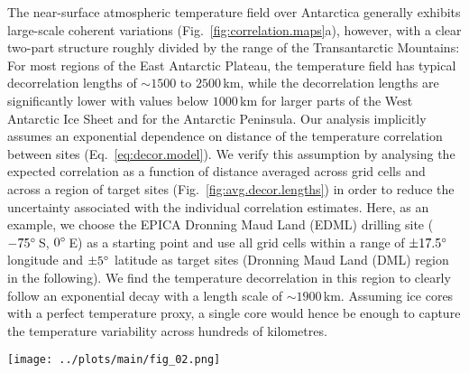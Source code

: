 \documentclass[cp, manuscript]{copernicus}
\begin{document}
The near-surface atmospheric temperature field over Antarctica generally
exhibits large-scale coherent variations (Fig.~\ref{fig:correlation.maps}a),
however, with a clear two-part structure roughly divided by the range of the
Transantarctic Mountains: For most regions of the East Antarctic Plateau, the
temperature field has typical decorrelation lengths of $\sim1500$ to $2500$\,km,
while the decorrelation lengths are significantly lower with values below
$1000$\,km for larger parts of the West Antarctic Ice Sheet and for the
Antarctic Peninsula. Our analysis implicitly assumes an exponential dependence
on distance of the temperature correlation between sites
(Eq.~\ref{eq:decor.model}). We verify this assumption by analysing the expected
correlation as a function of distance averaged across grid cells and across a
region of target sites (Fig.~\ref{fig:avg.decor.lengths}) in order to reduce the
uncertainty associated with the individual correlation estimates. Here, as an
example, we choose the EPICA Dronning Maud Land (EDML) drilling site
($-75^{\circ}$\,S, $0^{\circ}$\,E) as a starting point and use all grid cells
within a range of $\pm17.5^{\circ}$ longitude and $\pm5^{\circ}$ latitude as
target sites (Dronning Maud Land (DML) region in the following). We find the
temperature decorrelation in this region to clearly follow an exponential decay
with a length scale of $\sim1900$\,km. Assuming ice cores with a perfect
temperature proxy, a single core would hence be enough to capture the
temperature variability across hundreds of kilometres.

\begin{figure*}[t]%
\centering
\texttt{[image: ../plots/main/fig\_02.png]}
\caption{%
  Temperature decorrelation lengths and temperature--isotope
  relationship. (\textbf{a}) The temperature decorrelation lengths ($\tau$, in
  km) for each Antarctic model grid cell estimated by fitting an exponential
  model to the correlation--distance relationship obtained from correlating the
  local near-surface $T_{2\mathrm{m}}$ time series with the temperature time
  series from all other grid cells (Eq.~\ref{eq:decor.model}). Note that only
  continental grid cells are used for the fit. (\textbf{b}) The local
  correlation between the interannual near-surface temperature
  ($T_{2\mathrm{m}}$) and precipitation-weighted oxygen isotope composition
  ($\delta^{18}\mathrm{O}^{\mathrm{(pw)}}$) time series for each Antarctic model
  grid cell.}
\label{fig:correlation.maps}%
\end{figure*}%
\end{document}
